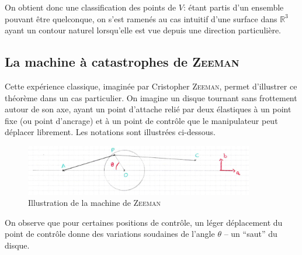 \documentclass{article}
\newcommand{\R}{\mathbb{R}}
\theoremstyle{definition}
\begin{document}
On obtient donc une classification des points de $V$: étant partis d'un ensemble pouvant être quelconque, on s'est ramenés au cas intuitif d'une surface dans $\R^3$ ayant un contour naturel lorsqu'elle est vue depuis une direction particulière.

\subsection{La machine à catastrophes de \textsc{Zeeman}}
Cette expérience classique, imaginée par Cristopher \textsc{Zeeman}, permet d'illustrer ce théorème dans un cas particulier.
On imagine un disque tournant sans frottement autour de son axe, ayant un point d'attache relié par deux élastiques à un point fixe (ou point d'ancrage) et à un point de contrôle que le manipulateur peut déplacer librement.
Les notations sont illustrées ci-dessous.

\begin{figure}[H]\centering \includegraphics[width=10cm, keepaspectratio]{images/zeeman_sketch.jpg}\caption{Illustration de la machine de \textsc{Zeeman}}\end{figure}

On observe que pour certaines positions de contrôle, un léger déplacement du point de contrôle donne des variations soudaines de l'angle $\theta$ -- un ``saut'' du disque.

%
\end{document}
